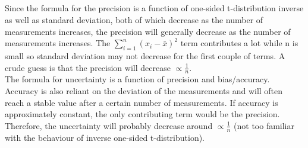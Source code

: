 \FloatBarrier
\subsection{}
Since the formula for the precision is a function of one-sided t-distribution inverse as well as standard deviation, both of which decrease as the number of measurements increases, the precision will generally decrease as the number of measurements increases. The $\sum_{i=1}^{n} (x_i - \bar{x})^2$ term contributes a lot while n is small so standard deviation may not decrease for the first couple of terms. A crude guess is that the precision will decrease $\propto \frac{1}{n}$.\\

\noindent The formula for uncertainty is a function of precision and bias/accuracy. Accuracy is also reliant on the deviation of the measurements and will often reach a stable value after a certain number of measurements. If accuracy is approximately constant, the only contributing term would be the precision. Therefore, the uncertainty will probably decrease around $\propto \frac{1}{n}$ (not too familiar with the behaviour of inverse one-sided t-distribution).
 